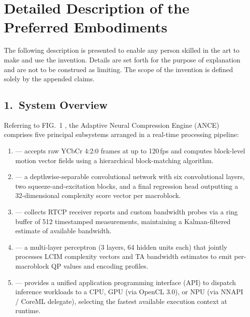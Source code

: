 \section{Detailed Description of the Preferred Embodiments}\label{sec:detailed}

The following description is presented to enable any person skilled in the art to make
and use the invention. Details are set forth for the purpose of explanation and are not
to be construed as limiting. The scope of the invention is defined solely by the appended
claims.

\subsection{1.~System Overview}

Referring to FIG.~1 , the Adaptive Neural Compression Engine (ANCE)
comprises five principal subsystems arranged in a real-time processing pipeline:

\begin{enumerate}[label=\arabic*., leftmargin=2em, itemsep=3pt]
  \item {}  — accepts raw YCbCr 4:2:0
    frames at up to 120\,fps and computes block-level motion vector fields using a
    hierarchical block-matching algorithm.
  \item {}  —
    a depthwise-separable convolutional network with six convolutional layers, two
    squeeze-and-excitation blocks, and a final regression head outputting a
    32-dimensional complexity score vector per macroblock.
  \item {}  — collects RTCP receiver
    reports and custom bandwidth probes via a ring buffer of 512 timestamped
    measurements, maintaining a Kalman-filtered estimate of available bandwidth.
  \item {}  — a multi-layer perceptron
    (3 layers, 64 hidden units each) that jointly processes LCIM complexity vectors
    and TA bandwidth estimates to emit per-macroblock QP values and encoding profiles.
  \item {}  — provides a
    unified application programming interface (API) to dispatch inference workloads
    to a CPU, GPU (via OpenCL 3.0), or NPU (via NNAPI / CoreML delegate), selecting
    the fastest available execution context at runtime.
\end{enumerate}

